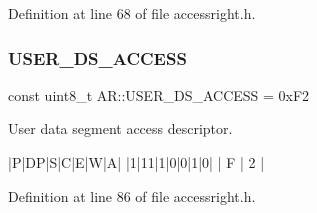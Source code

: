 Definition at line 68 of file accessright.\+h.

\mbox{\label{namespace_a_r_a1b8796b06b020a1610233d041b60e101}} 
\subsubsection{\texorpdfstring{U\+S\+E\+R\+\_\+\+D\+S\+\_\+\+A\+C\+C\+E\+SS}{USER\_DS\_ACCESS}}
{\footnotesize\ttfamily const uint8\+\_\+t A\+R\+::\+U\+S\+E\+R\+\_\+\+D\+S\+\_\+\+A\+C\+C\+E\+SS = 0x\+F2}



User data segment access descriptor. 

\begin{DoxyVerb}|P|DP|S|C|E|W|A|
|1|11|1|0|0|1|0|
|   F  |   2   |
\end{DoxyVerb}
 

Definition at line 86 of file accessright.\+h.

